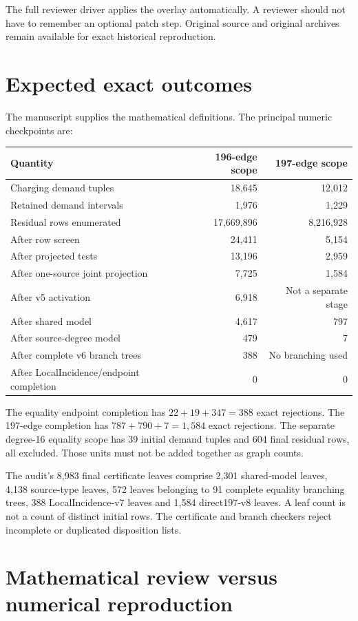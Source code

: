 \documentclass[11pt,a4paper]{article}
\begin{document}
The full reviewer driver applies the overlay automatically. A reviewer should not have to remember an optional patch step. Original source and original archives remain available for exact historical reproduction.

\section{Expected exact outcomes}
The manuscript supplies the mathematical definitions. The principal numeric checkpoints are:
\begin{center}\small\begin{tabular}{lrr}\toprule
Quantity&196-edge scope&197-edge scope\\\midrule
Charging demand tuples&18,645&12,012\\
Retained demand intervals&1,976&1,229\\
Residual rows enumerated&17,669,896&8,216,928\\
After row screen&24,411&5,154\\
After projected tests&13,196&2,959\\
After one-source joint projection&7,725&1,584\\
After v5 activation&6,918&Not a separate stage\\
After shared model&4,617&797\\
After source-degree model&479&7\\
After complete v6 branch trees&388&No branching used\\
After LocalIncidence/endpoint completion&0&0\\\bottomrule
\end{tabular}\end{center}
The equality endpoint completion has $22+19+347=388$ exact rejections. The 197-edge completion has $787+790+7=1,584$ exact rejections. The separate degree-16 equality scope has 39 initial demand tuples and 604 final residual rows, all excluded. Those units must not be added together as graph counts.

The audit's 8,983 final certificate leaves comprise 2,301 shared-model leaves, 4,138 source-type leaves, 572 leaves belonging to 91 complete equality branching trees, 388 LocalIncidence-v7 leaves and 1,584 direct197-v8 leaves. A leaf count is not a count of distinct initial rows. The certificate and branch checkers reject incomplete or duplicated disposition lists.

\section{Mathematical review versus numerical reproduction}
\end{document}
